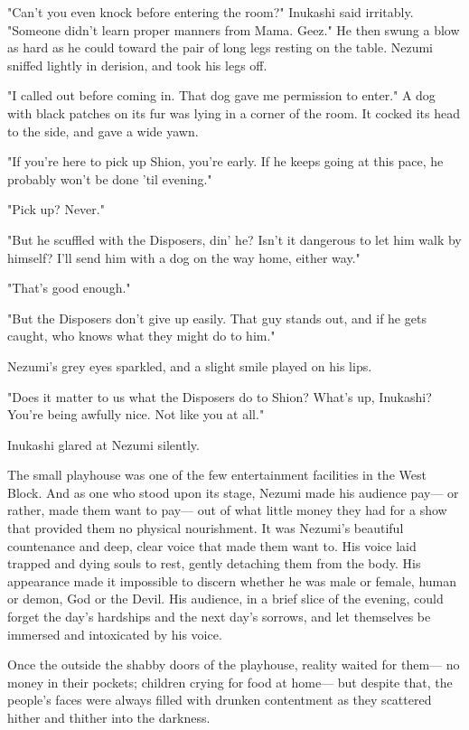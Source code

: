 "Can't you even knock before entering the room?" Inukashi said
irritably. "Someone didn't learn proper manners from Mama. Geez." He
then swung a blow as hard as he could toward the pair of long legs
resting on the table. Nezumi sniffed lightly in derision, and took his
legs off.

"I called out before coming in. That dog gave me permission to enter." A
dog with black patches on its fur was lying in a corner of the room. It
cocked its head to the side, and gave a wide yawn.

"If you're here to pick up Shion, you're early. If he keeps going at
this pace, he probably won't be done 'til evening."

"Pick up? Never."

"But he scuffled with the Disposers, din' he? Isn't it dangerous to let
him walk by himself? I'll send him with a dog on the way home, either
way."

"That's good enough."

"But the Disposers don't give up easily. That guy stands out, and if he
gets caught, who knows what they might do to him."

Nezumi's grey eyes sparkled, and a slight smile played on his lips.

"Does it matter to us what the Disposers do to Shion? What's up,
Inukashi? You're being awfully nice. Not like you at all."

Inukashi glared at Nezumi silently.

The small playhouse was one of the few entertainment facilities in the
West Block. And as one who stood upon its stage, Nezumi made his
audience pay--- or rather, made them want to pay--- out of what little money
they had for a show that provided them no physical nourishment. It was
Nezumi's beautiful countenance and deep, clear voice that made them want
to. His voice laid trapped and dying souls to rest, gently detaching
them from the body. His appearance made it impossible to discern whether
he was male or female, human or demon, God or the Devil. His audience,
in a brief slice of the evening, could forget the day's hardships and
the next day's sorrows, and let themselves be immersed and intoxicated
by his voice.

Once the outside the shabby doors of the playhouse, reality waited for
them--- no money in their pockets; children crying for food at home--- but
despite that, the people's faces were always filled with drunken
contentment as they scattered hither and thither into the darkness.

